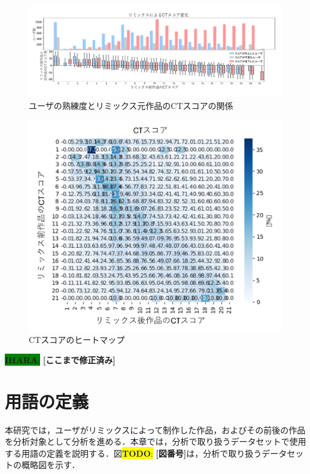 \documentclass[submit,techrep,noauthor]{ipsj}
\newcommand{\todo}[1]{\colorbox{yellow}{{\bf TODO}:}{\color{red} {\textbf{[#1]}}}}
\newcommand{\ihara}[1]{\colorbox{green}{{\bf IHARA}:}{\color{blue} {\textbf{[#1]}}}}
\begin{document}
\begin{figure}[t]
  \centering
  \includegraphics[width=\textwidth]{@IPSJ_SIGSE202511_Horio/fig/preAnalysis.pdf}
  \caption{ユーザの熟練度とリミックス元作品のCTスコアの関係}
  \label{preAnalysis}
\end{figure}
\begin{figure}[h]
  \centering
  \includegraphics[width=\linewidth]{@IPSJ_SIGSE202511_Horio/fig/heatmapCT.pdf}
  \caption{CTスコアのヒートマップ}
  \label{heatmapCT}
\end{figure}

\ihara{ここまで修正済み}


\section{用語の定義}
\label{sec:preAnalysis}

本研究では，ユーザがリミックスによって制作した作品，およびその前後の作品を分析対象として分析を進める．本章では，分析で取り扱うデータセットで使用する用語の定義を説明する．図\todo{図番号}は，分析で取り扱うデータセットの概略図を示す．
\end{document}
